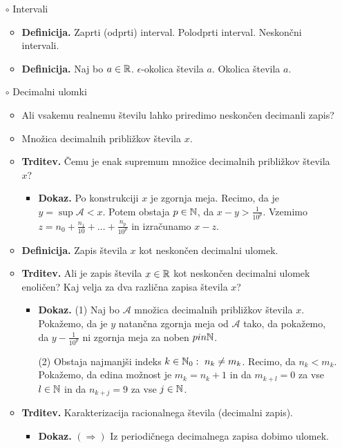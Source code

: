 \begin{enumerate}
    \item[$\circ$] Intervali
    \begin{itemize}
        \item \colorbox{purple!30}{\textbf{Definicija.}} Zaprti (odprti) interval. Polodprti interval. Neskončni intervali.
        \item \colorbox{purple!30}{\textbf{Definicija.}} Naj bo $a \in \mathbb{R}$. $\epsilon$-okolica števila $a$. Okolica števila $a$.
    \end{itemize}

    \newpage
    \item[$\circ$] Decimalni ulomki
    \begin{itemize}
        \item Ali vsakemu realnemu številu lahko priredimo neskončen decimanli zapis?
        \item Množica decimalnih približkov števila $x$.
        \item \colorbox{blue!30}{\textbf{Trditev.}} Čemu je enak supremum množice decimalnih približkov števila $x$?
        \begin{itemize}
            \item \colorbox{green!30}{\textbf{Dokaz.}} Po konstrukciji $x$ je zgornja meja. Recimo, da je $y = \sup \mathcal{A} < x$. Potem obstaja $p \in \mathbb{N}$, da $x - y > \frac{1}{10^p}$. Vzemimo $z = n_0 + \frac{n_1}{10} + \ldots + \frac{n_p}{10^p}$ in izračunamo $x-z$.
        \end{itemize}
        \item \colorbox{purple!30}{\textbf{Definicija.}} Zapis števila $x$ kot neskončen decimalni ulomek.
        \item \colorbox{blue!30}{\textbf{Trditev.}} Ali je zapis števila $x \in \mathbb{R}$ kot neskončen decimalni ulomek enoličen? Kaj velja za dva različna zapisa števila $x$?
        \begin{itemize}
            \item \colorbox{green!30}{\textbf{Dokaz.}} (1) Naj bo $\mathcal{A}$ množica decimalnih približkov števila $x$. Pokažemo, da je $y$ natančna zgornja meja od $\mathcal{A}$ tako, da pokažemo, da $y - \frac{1}{10^p}$ ni zgornja meja za noben $p in \mathbb{N}$.
            
            (2) Obstaja najmanjši indeks $k \in \mathbb{N}_0: \ n_k \neq m_k$. Recimo, da $n_k < m_k$. Pokažemo, da edina možnost je $m_k = n_k + 1$ in da $m_{k+l} = 0$ za vse $l \in \mathbb{N}$ in da $n_{k+j} = 9$ za vse $j \in \mathbb{N}$.
        \end{itemize}
        \item \colorbox{blue!30}{\textbf{Trditev.}} Karakterizacija racionalnega števila (decimalni zapis).
        \begin{itemize}
            \item \colorbox{green!30}{\textbf{Dokaz.}} $(\Rightarrow)$ Iz periodičnega decimalnega zapisa dobimo ulomek.
            

\end{itemize}
\end{itemize}
\end{enumerate}
